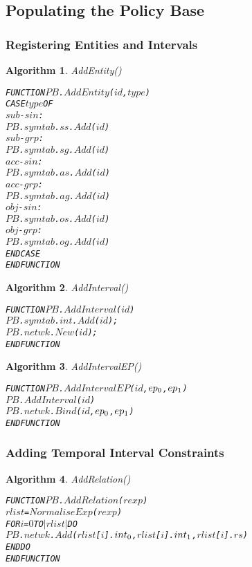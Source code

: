 \documentclass[11pt]{report}
\newenvironment{vverbatim}
{
  \begin{alltt}
}
{
    \vspace{-\baselineskip}
  \end{alltt}
}
\newtheorem{vvalgorithm}{Algorithm}[chapter]
\newenvironment{valgorithm}[2]
{
  \begin{vvalgorithm}{#1}
    \label{#2}
    \small
    \begin{vverbatim}
}
{
    \end{vverbatim}
  \end{vvalgorithm}
}
\begin{document}
      \subsection{Populating the Policy Base}

        \subsubsection{Registering Entities and Intervals}

          \begin{valgorithm}{AddEntity()}{algo-impln-adent}
FUNCTION \(PB\).\(AddEntity\)(\(id\), \(type\))
  CASE \(type\) OF
    \(sub\)-\(sin\) :
      \(PB\).\(symtab\).\(ss\).\(Add\)(\(id\))
    \(sub\)-\(grp\) :
      \(PB\).\(symtab\).\(sg\).\(Add\)(\(id\))
    \(acc\)-\(sin\) :
      \(PB\).\(symtab\).\(as\).\(Add\)(\(id\))
    \(acc\)-\(grp\) :
      \(PB\).\(symtab\).\(ag\).\(Add\)(\(id\))
    \(obj\)-\(sin\) :
      \(PB\).\(symtab\).\(os\).\(Add\)(\(id\))
    \(obj\)-\(grp\) :
      \(PB\).\(symtab\).\(og\).\(Add\)(\(id\))
  ENDCASE
ENDFUNCTION
          \end{valgorithm}

          \begin{valgorithm}{AddInterval()}{algo-impln-adint}
FUNCTION \(PB\).\(AddInterval\)(\(id\))
  \(PB\).\(symtab\).\(int\).\(Add\)(\(id\));
  \(PB\).\(netwk\).\(New\)(\(id\));
ENDFUNCTION
          \end{valgorithm}

          \begin{valgorithm}{AddIntervalEP()}{algo-impln-adine}
FUNCTION \(PB\).\(AddIntervalEP\)(\(id\), \(ep\sb{0}\), \(ep\sb{1}\))
  \(PB\).\(AddInterval\)(\(id\))
  \(PB\).\(netwk\).\(Bind\)(\(id\), \(ep\sb{0}\), \(ep\sb{1}\))
ENDFUNCTION
          \end{valgorithm}

        \subsubsection{Adding Temporal Interval Constraints}

          \begin{valgorithm}{AddRelation()}{algo-impln-adrel}
FUNCTION \(PB\).\(AddRelation\)(\(rexp\))
  \(rlist\) = \(NormaliseExp\)(\(rexp\))
  FOR \(i\) = \(0\) TO \(|rlist|\) DO
    \(PB\).\(netwk\).\(Add\)(\(rlist\)[\(i\)].\(int\sb{0}\), \(rlist\)[\(i\)].\(int\sb{1}\), \(rlist\)[\(i\)].\(rs\))
  ENDDO
ENDFUNCTION
          \end{valgorithm}
\end{document}
